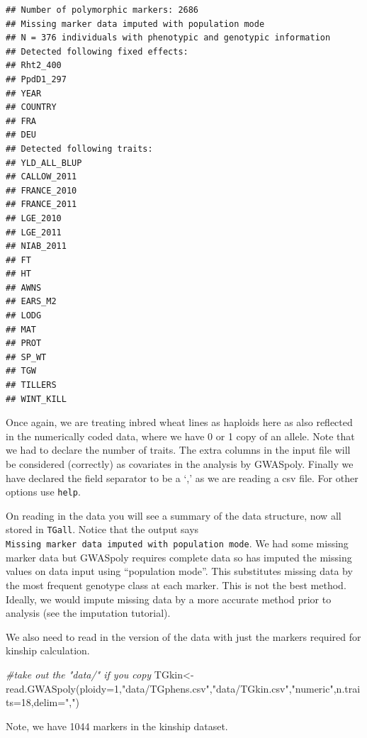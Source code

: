 \documentclass[
]{book}
\newenvironment{Shaded}{\begin{snugshade}}{\end{snugshade}}
\newcommand{\AttributeTok}[1]{\textcolor[rgb]{0.77,0.63,0.00}{#1}}
\newcommand{\CommentTok}[1]{\textcolor[rgb]{0.56,0.35,0.01}{\textit{#1}}}
\newcommand{\DecValTok}[1]{\textcolor[rgb]{0.00,0.00,0.81}{#1}}
\newcommand{\FunctionTok}[1]{\textcolor[rgb]{0.00,0.00,0.00}{#1}}
\newcommand{\NormalTok}[1]{#1}
\newcommand{\OtherTok}[1]{\textcolor[rgb]{0.56,0.35,0.01}{#1}}
\newcommand{\StringTok}[1]{\textcolor[rgb]{0.31,0.60,0.02}{#1}}
\begin{document}
\begin{verbatim}
## Number of polymorphic markers: 2686 
## Missing marker data imputed with population mode 
## N = 376 individuals with phenotypic and genotypic information 
## Detected following fixed effects:
## Rht2_400
## PpdD1_297
## YEAR
## COUNTRY
## FRA
## DEU
## Detected following traits:
## YLD_ALL_BLUP
## CALLOW_2011
## FRANCE_2010
## FRANCE_2011
## LGE_2010
## LGE_2011
## NIAB_2011
## FT
## HT
## AWNS
## EARS_M2
## LODG
## MAT
## PROT
## SP_WT
## TGW
## TILLERS
## WINT_KILL
\end{verbatim}

Once again, we are treating inbred wheat lines as haploids here as also reflected in the numerically coded data, where we have 0 or 1 copy of an allele. Note that we had to declare the number of traits. The extra columns in the input file will be considered (correctly) as covariates in the analysis by GWASpoly. Finally we have declared the field separator to be a `,' as we are reading a csv file. For other options use \texttt{help}.

On reading in the data you will see a summary of the data structure, now all stored in \texttt{TGall}. Notice that the output says \texttt{Missing\ marker\ data\ imputed\ with\ population\ mode}. We had some missing marker data but GWASpoly requires complete data so has imputed the missing values on data input using ``population mode''. This substitutes missing data by the most frequent genotype class at each marker. This is not the best method. Ideally, we would impute missing data by a more accurate method prior to analysis (see the imputation tutorial).

We also need to read in the version of the data with just the markers required for kinship calculation.

\begin{Shaded}
\begin{Highlighting}[]
\CommentTok{\#take out the "data/" if you copy}
\NormalTok{TGkin}\OtherTok{\textless{}{-}}\FunctionTok{read.GWASpoly}\NormalTok{(}\AttributeTok{ploidy=}\DecValTok{1}\NormalTok{,}\StringTok{"data/TGphens.csv"}\NormalTok{,}\StringTok{"data/TGkin.csv"}\NormalTok{,}\StringTok{"numeric"}\NormalTok{,}\AttributeTok{n.traits=}\DecValTok{18}\NormalTok{,}\AttributeTok{delim=}\StringTok{","}\NormalTok{)}
\end{Highlighting}
\end{Shaded}

Note, we have 1044 markers in the kinship dataset.
\end{document}
